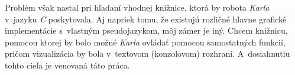 Problém však nastal pri hľadaní vhodnej knižnice, ktorá by robota \emph{Karla} v~jazyku \emph{C} poskytovala. Aj napriek tomu, že existujú rozličné hlavne grafické implementácie s~vlastným pseudojazykom, môj zámer je iný. Chcem knižnicu, pomocou ktorej by bolo možné \emph{Karla} ovládať pomocou samostatných funkcií, pričom vizualizácia by bola v~textovom (konzolovom) rozhraní. A~dosiahnutiu tohto cieľa je venovaná táto práca.



